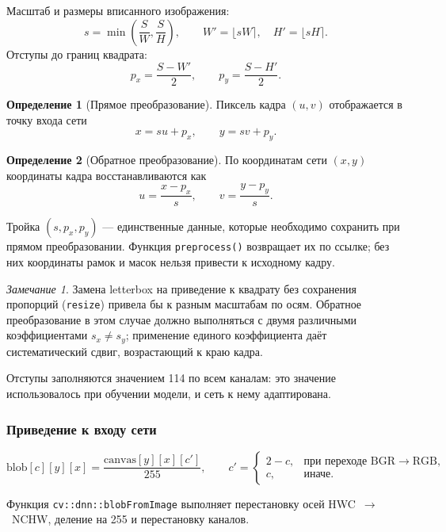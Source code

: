 \documentclass[11pt,a4paper]{article}
\theoremstyle{definition}
\newtheorem{definition}{Определение}[section]
\theoremstyle{remark}
\newtheorem*{remark}{Замечание}
\begin{document}
Масштаб и размеры вписанного изображения:
\[
  s = \min\left(\frac{S}{W}, \frac{S}{H}\right), \qquad
  W' = \lfloor sW \rceil, \quad H' = \lfloor sH \rceil .
\]
Отступы до границ квадрата:
\[
  p_x = \frac{S - W'}{2}, \qquad p_y = \frac{S - H'}{2} .
\]

\begin{definition}[Прямое преобразование]
Пиксель кадра $(u,v)$ отображается в точку входа сети
\[
  x = s u + p_x, \qquad y = s v + p_y .
\]
\end{definition}

\begin{definition}[Обратное преобразование]
По координатам сети $(x,y)$ координаты кадра восстанавливаются как
\[
  u = \frac{x - p_x}{s}, \qquad v = \frac{y - p_y}{s} .
\]
\end{definition}

Тройка $(s, p_x, p_y)$ --- единственные данные, которые необходимо сохранить
при прямом преобразовании. Функция \texttt{preprocess()} возвращает их по
ссылке; без них координаты рамок и масок нельзя привести к исходному кадру.

\begin{remark}
Замена letterbox на приведение к квадрату без сохранения пропорций
(\texttt{resize}) привела бы к разным масштабам по осям. Обратное
преобразование в этом случае должно выполняться с двумя различными
коэффициентами $s_x \neq s_y$; применение единого коэффициента даёт
систематический сдвиг, возрастающий к краю кадра.
\end{remark}

Отступы заполняются значением 114 по всем каналам: это значение
использовалось при обучении модели, и сеть к нему адаптирована.

\subsubsection{Приведение к входу сети}

\begin{equation}
  \text{blob}[c][y][x] = \frac{\text{canvas}[y][x][c']}{255},
  \qquad c' = \begin{cases}
    2 - c, & \text{при переходе BGR} \to \text{RGB},\\
    c, & \text{иначе}.
  \end{cases}
\end{equation}

Функция \texttt{cv::dnn::blobFromImage} выполняет перестановку осей
HWC~$\to$~NCHW, деление на 255 и перестановку каналов.
\end{document}
